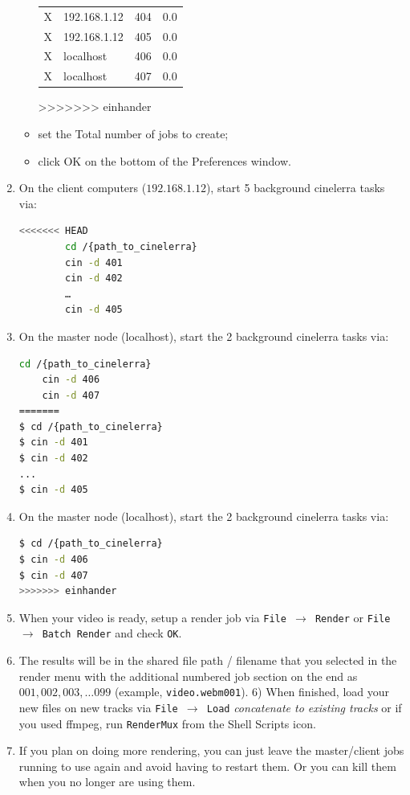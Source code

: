 \begin{enumerate}
\begin{itemize}
\begin{tabular}{lllc}
                X  & 192.168.1.12 & 404  & 0.0       \\
                X  & 192.168.1.12 & 405  & 0.0       \\
                X  & localhost    & 406  & 0.0       \\
                X  & localhost    & 407  & 0.0       \\
            \end{tabular}
>>>>>>> einhander
        \item set the Total number of jobs to create;
        \item click OK on the bottom of the Preferences window.
    \end{itemize}
    \item On the client computers ($192.168.1.12$), start 5 background cinelerra tasks via:
    \begin{lstlisting}[language=bash]
<<<<<<< HEAD
        cd /{path_to_cinelerra}
        cin -d 401
        cin -d 402
        …
        cin -d 405
    \end{lstlisting}
    \item On the master node (localhost), start the 2 background cinelerra tasks via:
    \begin{lstlisting}[language=bash]
    cd /{path_to_cinelerra}
    cin -d 406
    cin -d 407
=======
$ cd /{path_to_cinelerra}
$ cin -d 401
$ cin -d 402 
...
$ cin -d 405
    \end{lstlisting}
    \item On the master node (localhost), start the 2 background cinelerra tasks via:
    \begin{lstlisting}[language=bash]
$ cd /{path_to_cinelerra}
$ cin -d 406
$ cin -d 407
>>>>>>> einhander
    \end{lstlisting}
    \item When your video is ready, setup a render job via \texttt{File $\rightarrow$  Render} or \texttt{File $\rightarrow$  Batch Render} and check \texttt{OK}.
    \item The results will be in the shared file path / filename that you selected in the render menu with the
    additional numbered job section on the end as  $001, 002, 003, \dots 099$ (example, \texttt{video.webm001}).
    6) When finished, load your new files on new tracks via  \texttt{File  $\rightarrow$ Load} \textit{concatenate to existing tracks}  or if you used ffmpeg, run \texttt{RenderMux} from the Shell Scripts icon.
    \item If you plan on doing more rendering, you can just leave the master/client jobs running to use again
    and avoid having to restart them.  Or you can kill them when you no longer are using them.
\end{enumerate}

